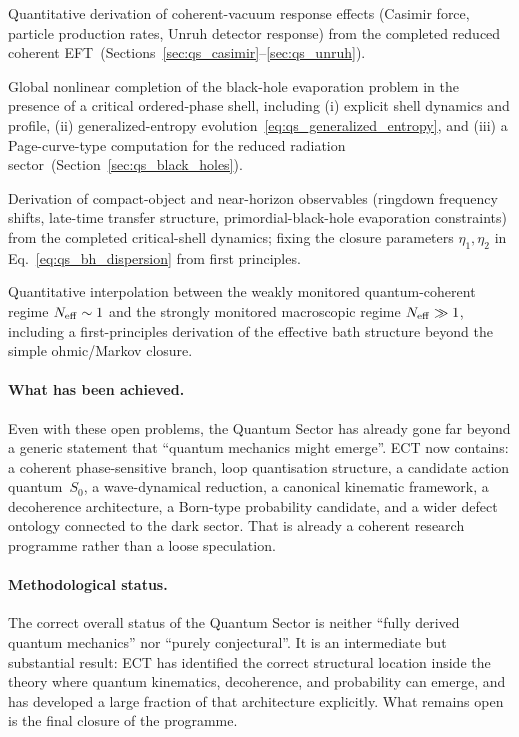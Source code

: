 \documentclass[11pt,a4paper]{article}
\numberwithin{equation}{section}
\begin{document}
\begin{description}[leftmargin=2.2em]
  \item[OP-Q12] Quantitative derivation of coherent-vacuum response
    effects (Casimir force, particle production rates, Unruh detector
    response) from the completed reduced coherent
    EFT~(Sections~\ref{sec:qs_casimir}--\ref{sec:qs_unruh}).
  \item[OP-Q13] Global nonlinear completion of the black-hole
    evaporation problem in the presence of a critical ordered-phase shell, including
    (i) explicit shell dynamics and profile,
    (ii) generalized-entropy evolution~\eqref{eq:qs_generalized_entropy},
    and (iii) a Page-curve-type computation for the reduced radiation
    sector~(Section~\ref{sec:qs_black_holes}).
  \item[OP-Q14] Derivation of compact-object and near-horizon
    observables (ringdown frequency shifts, late-time transfer
    structure, primordial-black-hole evaporation constraints) from
    the completed critical-shell dynamics;
    fixing the closure parameters $\eta_1,\eta_2$ in
    Eq.~\eqref{eq:qs_bh_dispersion} from first principles.
  \item[OP-Q15] Quantitative interpolation between the weakly
    monitored quantum-coherent regime $N_{\rm eff}\sim1$ and the
    strongly monitored macroscopic regime $N_{\rm eff}\gg1$,
    including a first-principles derivation of the effective bath
    structure beyond the simple ohmic/Markov closure.
\end{description}

\paragraph{What has been achieved.}
Even with these open problems, the Quantum Sector has already gone far
beyond a generic statement that ``quantum mechanics might emerge''.
ECT now contains:
a coherent phase-sensitive branch,
loop quantisation structure,
a candidate action quantum~$S_0$,
a wave-dynamical reduction,
a canonical kinematic framework,
a decoherence architecture,
a Born-type probability candidate,
and a wider defect ontology connected to the dark sector.
That is already a coherent research programme rather than a loose
speculation.

\paragraph{Methodological status.}
The correct overall status of the Quantum Sector is neither ``fully
derived quantum mechanics'' nor ``purely conjectural''.
It is an intermediate but substantial result: ECT has identified the
correct structural location inside the theory where quantum kinematics,
decoherence, and probability can emerge, and has developed a large
fraction of that architecture explicitly.
What remains open is the final closure of the programme.
\end{document}
